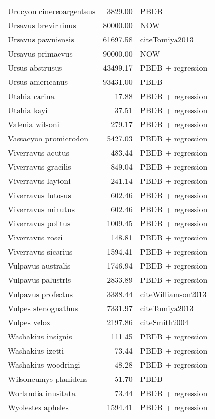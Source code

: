 \begin{table}[ht]
\begin{tabular}{lrl}
  Urocyon cinereoargenteus & 3829.00 & PBDB \\ 
  Ursavus brevirhinus & 80000.00 & NOW \\ 
  Ursavus pawniensis & 61697.58 & cite{Tomiya2013} \\ 
  Ursavus primaevus & 90000.00 & NOW \\ 
  Ursus abstrusus & 43499.17 & PBDB + regression \\ 
  Ursus americanus & 93431.00 & PBDB \\ 
  Utahia carina & 17.88 & PBDB + regression \\ 
  Utahia kayi & 37.51 & PBDB + regression \\ 
  Valenia wilsoni & 279.17 & PBDB + regression \\ 
  Vassacyon promicrodon & 5427.03 & PBDB + regression \\ 
  Viverravus acutus & 483.44 & PBDB + regression \\ 
  Viverravus gracilis & 849.04 & PBDB + regression \\ 
  Viverravus laytoni & 241.14 & PBDB + regression \\ 
  Viverravus lutosus & 602.46 & PBDB + regression \\ 
  Viverravus minutus & 602.46 & PBDB + regression \\ 
  Viverravus politus & 1009.45 & PBDB + regression \\ 
  Viverravus rosei & 148.81 & PBDB + regression \\ 
  Viverravus sicarius & 1594.41 & PBDB + regression \\ 
  Vulpavus australis & 1746.94 & PBDB + regression \\ 
  Vulpavus palustris & 2833.89 & PBDB + regression \\ 
  Vulpavus profectus & 3388.44 & cite{Williamson2013} \\ 
  Vulpes stenognathus & 7331.97 & cite{Tomiya2013} \\ 
  Vulpes velox & 2197.86 & cite{Smith2004} \\ 
  Washakius insignis & 111.45 & PBDB + regression \\ 
  Washakius izetti & 73.44 & PBDB + regression \\ 
  Washakius woodringi & 48.28 & PBDB + regression \\ 
  Wilsoneumys planidens & 51.70 & PBDB \\ 
  Worlandia inusitata & 73.44 & PBDB + regression \\ 
  Wyolestes apheles & 1594.41 & PBDB + regression \\ 

\end{tabular}
\end{table}
